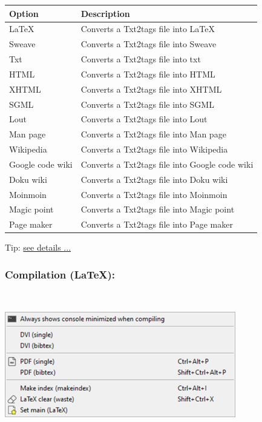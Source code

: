 \begin{scriptsize}
  \begin{tabularx}{\textwidth}{>{\hsize=0.3\hsize}X>{\hsize=0.7\hsize}X}\\
    \hline
    \textbf{Option} & \textbf{Description} \\
    \hline
    \LaTeX & Converts a Txt2tags file into \LaTeX \\
    Sweave & Converts a Txt2tags file into Sweave \\
    Txt & Converts a Txt2tags file into txt \\
    \hdashline[1pt/1pt]
    HTML & Converts a Txt2tags file into HTML \\
    XHTML & Converts a Txt2tags file into XHTML \\
    SGML & Converts a Txt2tags file into SGML \\
    Lout & Converts a Txt2tags file into Lout \\
    Man page & Converts a Txt2tags file into Man page \\
    \hdashline[1pt/1pt]
    Wikipedia & Converts a Txt2tags file into Wikipedia \\
    Google code wiki & Converts a Txt2tags file into Google code wiki \\
    Doku wiki & Converts a Txt2tags file into Doku wiki \\
    Moinmoin & Converts a Txt2tags file into Moinmoin \\
    \hdashline[1pt/1pt]
    Magic point & Converts a Txt2tags file into Magic point \\
    Page maker & Converts a Txt2tags file into Page maker \\
    \hline
  \end{tabularx}
\end{scriptsize}

Tip: \href{http://txt2tags.sourceforge.net/}{see details ...}


\hypertarget{menu_tools_processing_conversion_compilation}{}
\subsubsection{Compilation (\LaTeX):}\\

\includegraphics[scale=0.50]{./res/menu_tools_processing_compilation.png}\\

